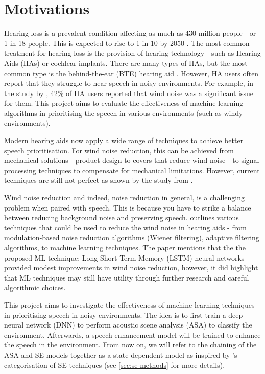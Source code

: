\documentclass[logo,bsc,singlespacing,parskip,online]{infthesis}
\begin{document}
\section{Motivations}
Hearing loss is a prevalent condition affecting as much as 
430 million people - or 1 in 18 people. This is expected 
to rise to 1 in 10 by 2050 \citep{WHO2024deafness}.
The most common treatment for hearing loss is the 
provision of hearing technology - such as Hearing Aids (HAs) or cochlear implants.
There are many types of HAs, but the most common
type is the behind-the-ear (BTE) hearing aid \citep{Kochkin2010MarkeTrak8}.
However, HA users often report that they struggle to hear speech
in noisy environments. For example, in the study by \citet{Kochkin2010MarkeTrak8},
42\% of HA users reported that wind noise was a significant issue for them.
This project aims to evaluate the effectiveness of machine learning algorithms
in prioritising the speech in various environments (such as windy environments).

Modern hearing aids now apply a wide range of techniques to achieve 
better speech prioritisation. For wind noise reduction, this can be achieved 
from mechanical solutions - product design to covers that reduce wind noise - to 
signal processing techniques to compensate for mechanical limitations.
However, current techniques are still not perfect as shown by the study from \citet{Kochkin2010MarkeTrak8}.

Wind noise reduction and indeed, noise reduction in general, is a challenging problem
when paired with speech. This is because you have 
to strike a balance between reducing background noise and
preserving speech. 
\citet{Korhonen2021WindNoise} outlines 
various techniques that could be used to reduce the wind noise in hearing aids -
from modulation-based noise reduction algorithms (Wiener filtering),
adaptive filtering algorithms, to machine learning techniques.
The paper mentions that the the proposed ML technique:
Long Short-Term Memory (LSTM) neural networks provided
modest improvements in wind noise reduction, however, it did highlight
that ML techniques may still have utility through further research 
and careful algorithmic choices. 

This project aims to investigate the effectiveness of machine learning techniques 
in prioritising speech in noisy environments. The idea is to 
first train a deep neural network (DNN) to perform acoustic scene analysis (ASA) to classify the environment.
Afterwards, a speech enhancement model will be trained to enhance the speech in the environment.
From now on, we will refer to the chaining of the ASA and SE models together as a state-dependent model
as inspired by \citet{katagiri_handbook_2000}'s categorisation of SE techniques (see \ref{sec:se-methods} for more details).
\end{document}
